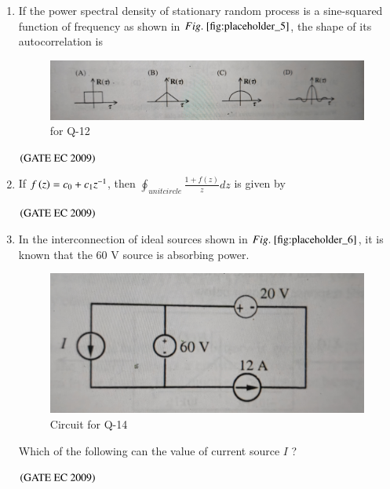 \documentclass[journal,12pt,onecolumn]{IEEEtran}
\theoremstyle{remark}
\begin{document}
\begin{enumerate}[start=1, label={Q\arabic*.}]
\item If the power spectral density of stationary random process is a sine-squared function of frequency as shown in $\figref{fig:placeholder_5}$, the shape of its autocorrelation is

\begin{figure}[H]
    \centering
    \includegraphics[width=0.5\columnwidth]{figs/img_5.jpg}
    \caption{for Q-12}
    \label{fig:placeholder_5}
\end{figure}
\hfill $\left(\text{GATE EC 2009}\right)$



\item If $f\left(z\right) = c_0 + c_1z^{-1}$, then $\oint_{unit circle} \frac{1+f(z)}{z} dz$ is given by

\begin{enumerate}
\end{enumerate}
\hfill $\left(\text{GATE EC 2009}\right)$

\item In the interconnection of ideal sources shown in $\figref{fig:placeholder_6}$, it is known that the 60 V source is absorbing power.
\begin{figure}[H]
    \centering
    \includegraphics[width=0.5\columnwidth]{figs/img_6.jpg}
    \caption{Circuit for Q-14}
    \label{fig:placeholder_6}
\end{figure}
Which of the following can the value of current source ${I}$ ?

\begin{enumerate}
\end{enumerate}
\hfill $\left(\text{GATE EC 2009}\right)$


\end{enumerate}
\end{document}
